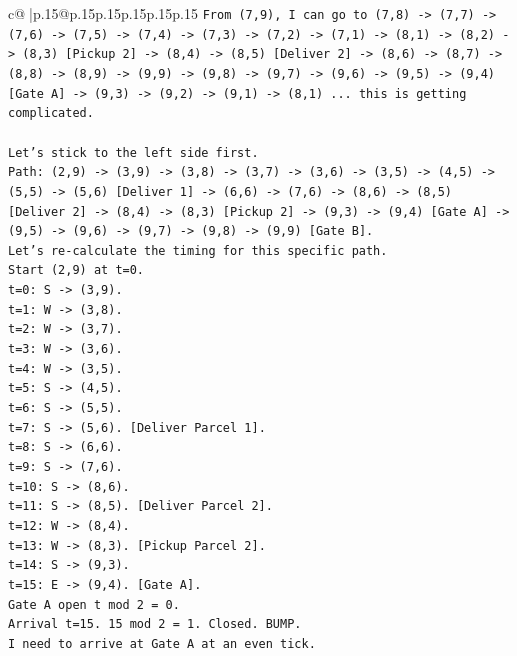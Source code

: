 \documentclass{article}
\begin{document}
{\begin{supertabular}{c@{$\;$}|p{.15\linewidth}@{}p{.15\linewidth}p{.15\linewidth}p{.15\linewidth}p{.15\linewidth}p{.15\linewidth}}
{{{\texttt{From (7,9), I can go to (7,8) {-}> (7,7) {-}> (7,6) {-}> (7,5) {-}> (7,4) {-}> (7,3) {-}> (7,2) {-}> (7,1) {-}> (8,1) {-}> (8,2) {-}> (8,3) {[}Pickup 2{]} {-}> (8,4) {-}> (8,5) {[}Deliver 2{]} {-}> (8,6) {-}> (8,7) {-}> (8,8) {-}> (8,9) {-}> (9,9) {-}> (9,8) {-}> (9,7) {-}> (9,6) {-}> (9,5) {-}> (9,4) {[}Gate A{]} {-}> (9,3) {-}> (9,2) {-}> (9,1) {-}> (8,1) ... this is getting complicated.} \\
\\ 
\texttt{Let's stick to the left side first.} \\
\texttt{Path: (2,9) {-}> (3,9) {-}> (3,8) {-}> (3,7) {-}> (3,6) {-}> (3,5) {-}> (4,5) {-}> (5,5) {-}> (5,6) {[}Deliver 1{]} {-}> (6,6) {-}> (7,6) {-}> (8,6) {-}> (8,5) {[}Deliver 2{]} {-}> (8,4) {-}> (8,3) {[}Pickup 2{]} {-}> (9,3) {-}> (9,4) {[}Gate A{]} {-}> (9,5) {-}> (9,6) {-}> (9,7) {-}> (9,8) {-}> (9,9) {[}Gate B{]}.} \\
\texttt{Let's re{-}calculate the timing for this specific path.} \\
\texttt{Start (2,9) at t=0.} \\
\texttt{t=0: S {-}> (3,9).} \\
\texttt{t=1: W {-}> (3,8).} \\
\texttt{t=2: W {-}> (3,7).} \\
\texttt{t=3: W {-}> (3,6).} \\
\texttt{t=4: W {-}> (3,5).} \\
\texttt{t=5: S {-}> (4,5).} \\
\texttt{t=6: S {-}> (5,5).} \\
\texttt{t=7: S {-}> (5,6). {[}Deliver Parcel 1{]}.} \\
\texttt{t=8: S {-}> (6,6).} \\
\texttt{t=9: S {-}> (7,6).} \\
\texttt{t=10: S {-}> (8,6).} \\
\texttt{t=11: S {-}> (8,5). {[}Deliver Parcel 2{]}.} \\
\texttt{t=12: W {-}> (8,4).} \\
\texttt{t=13: W {-}> (8,3). {[}Pickup Parcel 2{]}.} \\
\texttt{t=14: S {-}> (9,3).} \\
\texttt{t=15: E {-}> (9,4). {[}Gate A{]}.} \\
\texttt{Gate A open t mod 2 = 0.} \\
\texttt{Arrival t=15. 15 mod 2 = 1. Closed. BUMP.} \\
\texttt{I need to arrive at Gate A at an even tick.} \\
}}}
\end{supertabular}}
\end{document}
